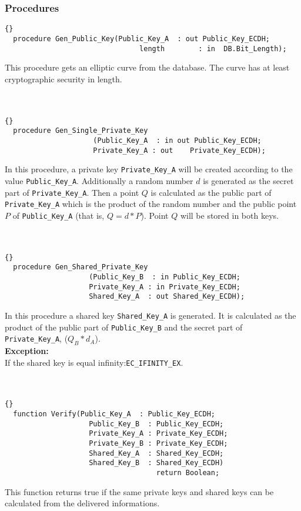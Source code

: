 \subsubsection*{Procedures}
\begin{lstlisting}{}
  procedure Gen_Public_Key(Public_Key_A  : out Public_Key_ECDH;
			    			   	length        : in  DB.Bit_Length);
\end{lstlisting}
This procedure gets an elliptic curve from the database. The curve has at least cryptographic security in length.\\
\hline \\ \ \\
\begin{lstlisting}{}
  procedure Gen_Single_Private_Key
  					 (Public_Key_A  : in out Public_Key_ECDH;
				     Private_Key_A : out    Private_Key_ECDH);
\end{lstlisting}
In this procedure, a private key \texttt{Private\_Key\_A} will be created according to the value \texttt{Public\_Key\_A}. Additionally a random number $d$ is generated as the secret part of \texttt{Private\_\-Key\_A}. Then a point $Q$ is calculated as the public part of \texttt{Private\_Key\_A} which is the product of the random number and the public point $P$ of \texttt{Public\_Key\_A} (that is, $Q=d*P$). Point $Q$ will be stored in both keys.\\
\hline \\ \ \\
\begin{lstlisting}{}
  procedure Gen_Shared_Private_Key
  					(Public_Key_B  : in Public_Key_ECDH;
				    Private_Key_A : in Private_Key_ECDH;
				    Shared_Key_A  : out Shared_Key_ECDH);
\end{lstlisting}
In this procedure a shared key \texttt{Shared\_Key\_A} is generated. It is calculated as the product of the public part of \texttt{Public\_Key\_B} and the secret part of \texttt{Private\_Key\_A}, ($Q_B*d_A$).\\
\textbf{Exception:}\\
If the shared key is equal infinity:\quad \texttt{EC\_IFINITY\_EX}.\\
\hline \\ \ \\
\begin{lstlisting}{}
  function Verify(Public_Key_A  : Public_Key_ECDH;
		   			Public_Key_B  : Public_Key_ECDH;
		   			Private_Key_A : Private_Key_ECDH;
		   			Private_Key_B : Private_Key_ECDH;
		   			Shared_Key_A  : Shared_Key_ECDH;
		   			Shared_Key_B  : Shared_Key_ECDH) 
		   			                return Boolean;
\end{lstlisting}
This function returns true if the same private keys and shared keys can be calculated from the delivered informations.\\
